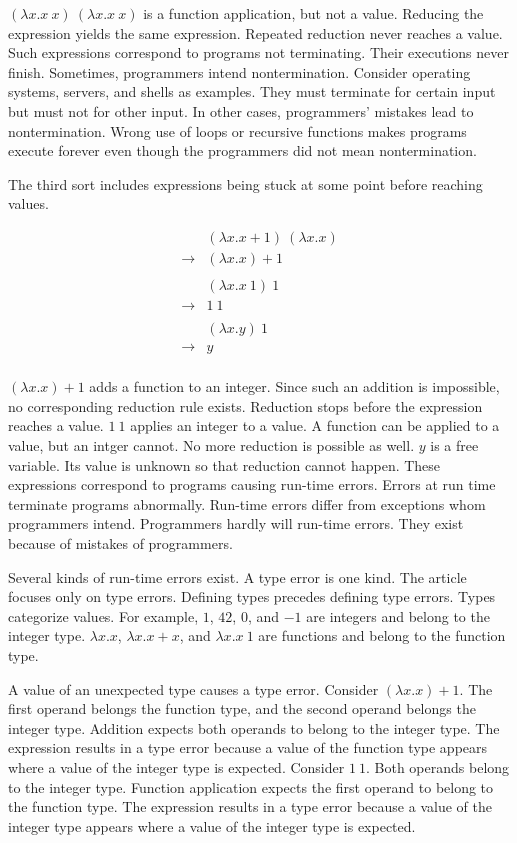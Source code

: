 $(\lambda x.x\ x)\ (\lambda x.x\ x)$ is a function application, but not a value.
Reducing the expression yields the same expression. Repeated reduction never
reaches a value. Such expressions correspond to programs not terminating. Their
executions never finish. Sometimes, programmers intend nontermination. Consider
operating systems, servers, and shells as examples. They must terminate for
certain input but must not for other input. In other cases, programmers' mistakes
lead to nontermination. Wrong use of loops or recursive functions makes programs
execute forever even though the programmers did not mean nontermination.

The third sort includes expressions being stuck at some point before reaching
values.

\[
\begin{array}{rl}
& (\lambda x.x+1)\ (\lambda x.x) \\
\rightarrow & (\lambda x.x)+1 \\
\\
& (\lambda x.x\ 1)\ 1 \\
\rightarrow & 1\ 1 \\
\\
& (\lambda x.y)\ 1 \\
\rightarrow & y \\
\end{array}
\]

$(\lambda x.x)+1$ adds a function to an integer. Since such an addition is
impossible, no corresponding reduction rule exists. Reduction stops before the
expression reaches a value. $1\ 1$ applies an integer to a value. A function can
be applied to a value, but an intger cannot. No more reduction is possible as
well. $y$ is a free variable. Its value is unknown so that reduction cannot
happen. These expressions correspond to programs causing run-time errors. Errors
at run time terminate programs abnormally. Run-time errors differ from exceptions
whom programmers intend. Programmers hardly will run-time errors. They exist
because of mistakes of programmers.

Several kinds of run-time errors exist. A type error is one kind. The article
focuses only on type errors. Defining types precedes defining type errors. Types
categorize values. For example, $1$, $42$, $0$, and $-1$ are integers and belong
to the integer type. $\lambda x.x$, $\lambda x.x+x$, and $\lambda x.x\ 1$ are
functions and belong to the function type.

A value of an unexpected type causes a type error. Consider $(\lambda x.x)+1$.
The first operand belongs the function type, and the second operand belongs the
integer type. Addition expects both operands to belong to the integer type. The
expression results in a type error because a value of the function type appears
where a value of the integer type is expected. Consider $1\ 1$. Both operands
belong to the integer type. Function application expects the first operand to
belong to the function type. The expression results in a type error because a
value of the integer type appears where a value of the integer type is expected.

